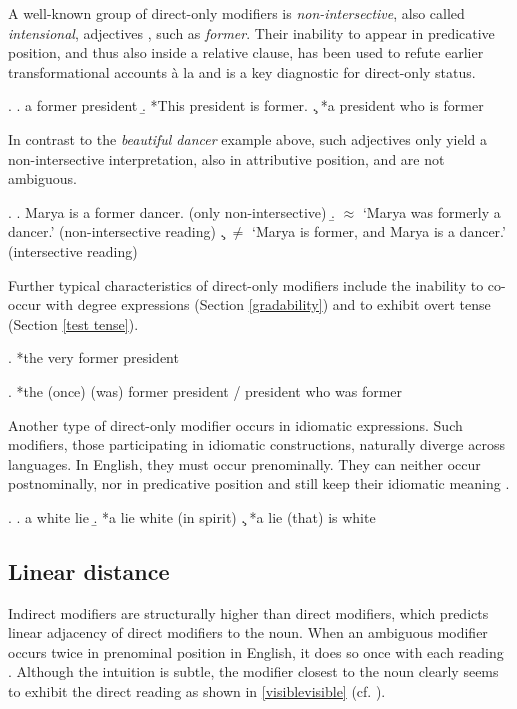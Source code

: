 A well-known group of direct-only modifiers is \textit{non-intersective}, also called \textit{intensional}, adjectives \citep{kamp:1995:prototype, panayidou:2013:in}, such as \textit{former}. Their inability to appear in predicative position, and thus also inside a relative clause, has been used to refute earlier transformational accounts à la \citet{smith:1964:det} and is a key diagnostic for direct-only status.

\ex. \a. a former president
\b. *This president is former.
\c. *a president who is former

In contrast to the \textit{beautiful dancer} example above, such adjectives only yield a non-intersective interpretation, also in attributive position, and are not ambiguous.

\ex. \a. Marya is a former dancer. (only non-intersective)
\b. $\approx$ `Marya was formerly a dancer.’ (non-intersective reading)
\c. $\neq$ `Marya is former, and Marya is a dancer.’ (intersective reading) \\ \null\hfill \citep[304]{alex:2007:nounphrase}

Further typical characteristics of direct-only modifiers include the inability to co-occur with degree expressions (Section \ref{gradability}) and to exhibit overt tense (Section \ref{test tense}).

\ex. *the very former president

\ex. *the (once) (was) former president / president who was former

Another type of direct-only modifier occurs in idiomatic expressions. Such modifiers, those participating in idiomatic constructions, naturally diverge across languages. In English, they must occur prenominally. They can neither occur postnominally, nor in predicative position and still keep their idiomatic meaning \citep[§ 7.2]{cinque:2010:adj}.

\ex. \a. a white lie \hfill \citep[88]{cinque:2010:adj}
\b. *a lie white (in spirit)
\c. *a lie (that) is white

\subsection{Linear distance}

Indirect modifiers are structurally higher than direct modifiers, which predicts linear adjacency of direct modifiers to the noun. When an ambiguous modifier occurs twice in prenominal position in  English, it does so once with each reading \citep[19–20]{cinque:2010:adj}. Although the intuition is subtle, the modifier closest to the noun clearly seems to exhibit the direct reading as shown in \ref{visiblevisible} (cf. \citealt[280–281]{larson:2004:indefinite}).

